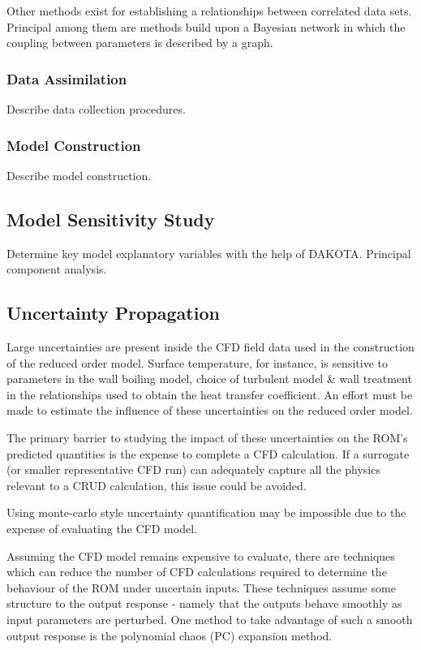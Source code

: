 \documentclass[10pt,a4paper]{report}
\begin{document}
Other methods exist for establishing a relationships between correlated data sets.  Principal among them are methods build upon a Bayesian network in which the coupling between parameters is described by a graph.

\subsubsection{Data Assimilation}

Describe data collection procedures.

\subsubsection{Model Construction}

Describe model construction.

\subsection{Model Sensitivity Study}

Determine key model explanatory variables with the help of DAKOTA.  Principal component analysis.

\subsection{Uncertainty Propagation}

Large uncertainties are present inside the CFD field data used in the construction of the reduced order model.  Surface temperature, for instance, is sensitive to parameters in the wall boiling model, choice of turbulent model \& wall treatment in the relationships used to obtain the heat transfer coefficient.
An effort must be made to estimate the influence of these uncertainties on the reduced order model.

The primary barrier to studying the impact of these uncertainties on the ROM's predicted quantities is the expense to complete a CFD calculation.  If a surrogate (or smaller representative CFD run) can adequately capture all the physics relevant to a CRUD calculation, this issue could be avoided.

Using monte-carlo style uncertainty quantification may be impossible due to the expense of evaluating the CFD model.

Assuming the CFD model remains expensive to evaluate, there are techniques which can reduce the number of CFD calculations required to determine the behaviour of the ROM under uncertain inputs.  These techniques assume some structure to the output response - namely that the outputs behave smoothly as input parameters are perturbed. One method to take advantage of such a smooth output response is the polynomial chaos (PC) expansion method.
\end{document}
